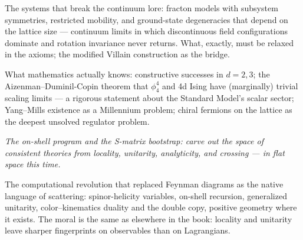 The systems that break the continuum lore: fracton models with subsystem symmetries, restricted mobility, and ground-state degeneracies that depend on the lattice size --- continuum limits in which discontinuous field configurations dominate and rotation invariance never returns. What, exactly, must be relaxed in the axioms; the modified Villain construction as the bridge.

What mathematics actually knows: constructive successes in $d=2,3$; the Aizenman--Duminil-Copin theorem that $\phi^4_4$ and 4d Ising have (marginally) trivial scaling limits --- a rigorous statement about the Standard Model's scalar sector; Yang--Mills existence as a Millennium problem; chiral fermions on the lattice as the deepest unsolved regulator problem.


\noin \emph{The on-shell program and the S-matrix bootstrap: carve out the space of consistent theories from locality, unitarity, analyticity, and crossing --- in flat space this time.}

The computational revolution that replaced Feynman diagrams as the native language of scattering: spinor-helicity variables, on-shell recursion, generalized unitarity, color--kinematics duality and the double copy, positive geometry where it exists. The moral is the same as elsewhere in the book: locality and unitarity leave sharper fingerprints on observables than on Lagrangians.

